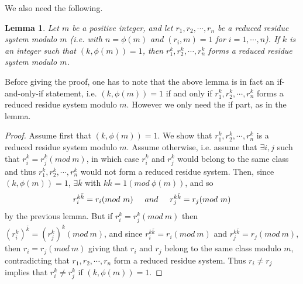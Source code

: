\documentclass[12pt,letterpaper]{book}
\newtheorem{lemma}{Lemma}
\begin{document}
We also need the following.

\begin{lemma}
Let $m$ be a positive integer, and let $r_1, r_2,\cdots, r_n$ be a reduced residue system
modulo $m$ (i.e. with $n=\phi(m)$ and $(r_i,m)=1$ for $i=1,\cdots,n$). If $k$ is an integer such
that $(k,\phi(m))=1$, then $r_1^k, r_2^k,\cdots, r_n^k$ forms a reduced residue system modulo $m$.
\end{lemma}

Before giving the proof, one has to note that the above lemma is in fact an if-and-only-if statement,
i.e. $(k,\phi(m))=1$ if and only if $r_1^k, r_2^k,\cdots, r_n^k$ forms a reduced residue system modulo $m$.
However we only need the if part, as in the lemma.

\begin{proof}
Assume first that $(k,\phi(m))=1$. We show that $r_1^k, r_2^k,\cdots, r_n^k$ is a reduced residue system modulo $m$.
Assume otherwise, i.e. assume that $\exists i,j$ such that $r_i^k=r_j^k(mod\ m)$, in which case $r_i^k$ and $r_j^k$
would belong to the same class and thus $r_1^k, r_2^k,\cdots, r_n^k$ would not form a reduced residue system.
Then, since $(k,\phi(m))=1$, $\exists\bar{k}$ with $k\bar{k}=1(mod\ \phi(m))$, and so
\begin{equation}
r_i^{k\bar{k}}=r_i(mod\ m)\hspace{0.5cm}and\hspace{0.5cm}r_j^{k\bar{k}}=r_j(mod\ m)
\end{equation}
by the previous lemma. But if $r_i^k=r_j^k(mod\ m)$ then $(r_i^k)^{\bar{k}}=(r_j^k)^{\bar{k}}(mod\ m)$,
and since $r_i^{k\bar{k}}=r_i(mod\ m)$ and $r_j^{k\bar{k}}=r_j(mod\ m)$, then $r_i=r_j(mod\ m)$ giving
that $r_i$ and $r_j$ belong to the same class modulo $m$, contradicting that $r_1, r_2,\cdots, r_n$ form a reduced
residue system. Thus $r_i\neq r_j$ implies that $r_i^k\neq r_j^k$ if $(k,\phi(m))=1$.
\end{proof}
\end{document}
